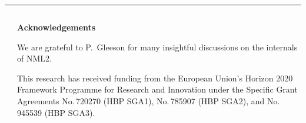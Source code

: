 \documentclass{beamer}
\begin{document}
\begin{frame}[t, fragile]
  \vspace*{1ex}
  \textcolor{arbgrey}{\rule{\textwidth}{0.5ex}}
  \vspace*{-1ex}
  \begin{columns}
    \begin{column}{0.49\textwidth}
      \printbibliography
    \end{column}
    \begin{column}{0.49\textwidth}
      \textbf{Acknowledgements}

      We are grateful to P.~Gleeson for many insightful discussions on the
      internals of NML2.

      This research has received funding from the European Union's Horizon 2020
      Framework Programme for Research and Innovation under the Specific Grant
      Agreements No.\,720270 (HBP SGA1), No.\,785907 (HBP SGA2), and No.\,945539
      (HBP SGA3).
    \end{column}
  \end{columns}
\end{frame}
\end{document}
